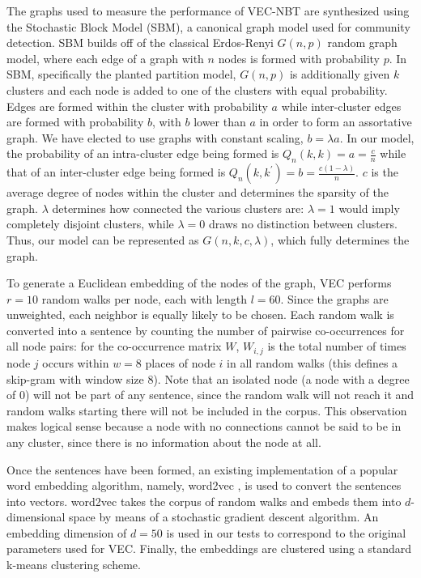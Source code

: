 \documentclass{article} %
\begin{document}
The graphs used to measure the performance of VEC-NBT are synthesized using the Stochastic Block Model (SBM), a canonical graph model used for community detection. SBM builds off of the classical Erdos-Renyi $G(n,p)$ random graph model, where each edge of a graph with $n$ nodes is formed with probability $p$. In SBM, specifically the planted partition model, $G(n,p)$ is additionally given $k$ clusters and each node is added to one of the clusters with equal probability. Edges are formed within the cluster with probability $a$ while inter-cluster edges are formed with probability $b$, with $b$ lower than $a$ in order to form an assortative graph. We have elected to use graphs with constant scaling, $b = \lambda a$. In our model, the probability of an intra-cluster edge being formed is $Q_n(k,k) = a = \frac{c}{n}$ while that of an inter-cluster edge being formed is $Q_n(k,k^\prime) = b = \frac{c(1-\lambda)}{n}$. $c$ is the average degree of nodes within the cluster and determines the sparsity of the graph. $\lambda$ determines how connected the various clusters are: $\lambda=1$ would imply completely disjoint clusters, while $\lambda=0$ draws no distinction between clusters.  Thus, our model can be represented as $G(n,k,c,\lambda)$, which fully determines the graph.

To generate a Euclidean embedding of the nodes of the graph, VEC performs $r = 10$ random walks per node, each with length $l = 60$. Since the graphs are unweighted, each neighbor is equally likely to be chosen. Each random walk is converted into a sentence by counting the number of pairwise co-occurrences for all node pairs: for the co-occurrence matrix $W$, $W_{i,j}$ is the total number of times node $j$ occurs within $w=8$ places of node $i$ in all random walks (this defines a skip-gram with window size 8). Note that an isolated node (a node with a degree of 0) will not be part of any sentence, since the random walk will not reach it and random walks starting there will not be included in the corpus. This observation makes logical sense because a node with no connections cannot be said to be in any cluster, since there is no information about the node at all.

Once the sentences have been formed, an existing implementation of a popular word embedding algorithm, namely, word2vec \cite{word2vec}, is used to convert the sentences into vectors. word2vec takes the corpus of random walks and embeds them into $d$-dimensional space by means of a stochastic gradient descent algorithm. An embedding dimension of $d=50$ is used in our tests to correspond to the original parameters used for VEC. Finally, the embeddings are clustered using a standard k-means clustering scheme.
\end{document}
